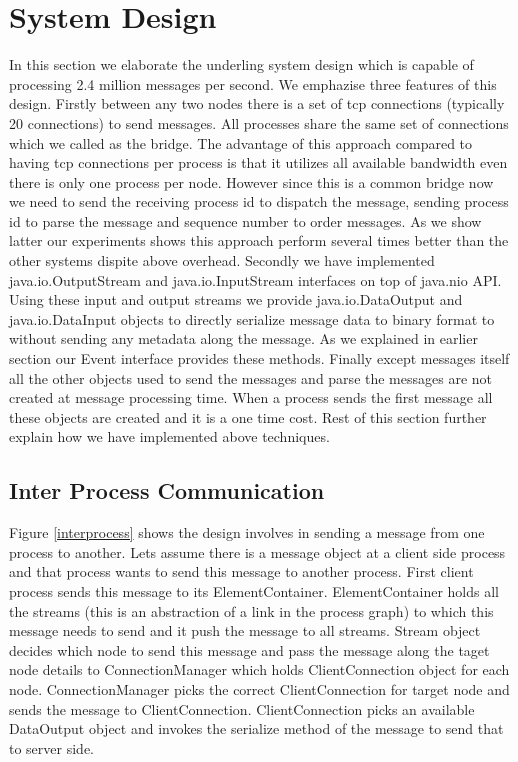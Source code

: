 \section{System Design}
In this section we elaborate the underling system design which is capable of processing 2.4 million messages per second. We emphazise three features of this design. Firstly between any two nodes there is a set of tcp connections (typically 20 connections)  to send messages. All processes share the same set of connections which we called as the bridge. The advantage of this approach compared to having tcp connections per process is that it utilizes all available bandwidth even there is only one process per node. However since this is a common bridge now we need to send the receiving process id to dispatch the message, sending  process id to parse the message and sequence number to order messages. As we show latter our experiments shows this approach perform several times better than the other systems dispite above overhead. Secondly we have implemented java.io.OutputStream and java.io.InputStream interfaces on top of java.nio API. Using these input and output streams we provide java.io.DataOutput and java.io.DataInput 
objects to directly serialize message data to binary format to without sending any metadata along the message. As we explained in earlier section our Event interface provides these methods. Finally except messages itself all the other objects used to send the messages and parse the messages are not created at message processing time. When a process sends the first message all these objects are created and it is a one time cost. Rest of this section further explain how we have implemented above techniques.
\subsection{Inter Process Communication}
Figure \ref{interprocess} shows the design involves in sending a message from one process to another. Lets assume there is a message object at a client side process and that process wants to send this message to another process. First client process sends this message to its ElementContainer. ElementContainer holds all the streams (this is an abstraction of a link in the process graph) to which this message needs to send and it push the message to all streams. Stream object decides which node to send this message and pass the message along the taget node details to ConnectionManager which holds ClientConnection object for each node. ConnectionManager picks the correct ClientConnection for target node and sends the message to ClientConnection. ClientConnection picks an available DataOutput object and invokes the serialize method of the message to send that to server side.

